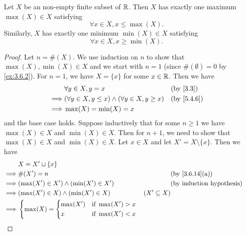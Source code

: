 \begin{ac}\label{ac:5.4.1}
  Let \(X\) be an non-empty finite subset of \(\mathbb{R}\).
  Then \(X\) has exactly one maximum \(\max(X) \in X\) satisfying
  \[
    \forall x \in X, x \leq \max(X).
  \]
  Similarly, \(X\) has exactly one minimum \(\min(X) \in X\) satisfying
  \[
    \forall x \in X, x \geq \min(X).
  \]
\end{ac}

\begin{proof}
  Let \(n = \#(X)\).
  We use induction on \(n\) to show that \(\max(X), \min(X) \in X\) and we start with \(n = 1\) (since \(\#(\emptyset) = 0\) by \cref{ex:3.6.2}).
  For \(n = 1\), we have \(X = \{x\}\) for some \(x \in \mathbb{R}\).
  Then we have
  \begin{align*}
             & \forall y \in X, y = x                                        &  & \text{(by \cref{3.3})}   \\
    \implies & (\forall y \in X, y \leq x) \land (\forall y \in X, y \geq x) &  & \text{(by \cref{5.4.6})} \\
    \implies & \max(X) = \min(X) = x
  \end{align*}
  and the base case holds.
  Suppose inductively that for some \(n \geq 1\) we have \(\max(X) \in X\) and \(\min(X) \in X\).
  Then for \(n + 1\), we need to show that \(\max(X) \in X\) and \(\min(X) \in X\).
  Let \(x \in X\) and let \(X' = X \setminus \{x\}\).
  Then we have
  \begin{align*}
             & X = X' \cup \{x\}                                                                                                                               \\
    \implies & \#(X') = n                                                                                &                  & \text{(by \cref{3.6.14}(a))}     \\
    \implies & (\max(X') \in X') \land (\min(X') \in X')                                                 &                  & \text{(by induction hypothesis)} \\
    \implies & (\max(X') \in X) \land (\min(X') \in X)                                                   & (X' \subseteq X)                                    \\
    \implies & \begin{dcases}
                 \max(X) = \begin{dcases}
                  \max(X') & \text{if } \max(X') > x \\
                  x        & \text{if } \max(X') < x

\end{dcases}
\end{dcases}
\end{align*}
\end{proof}
